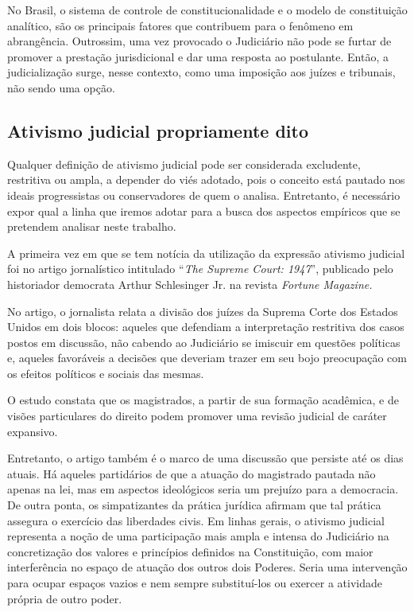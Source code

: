 {No Brasil, o sistema de controle de constitucionalidade e o modelo de
constituição analítico, são os principais fatores que contribuem para o
fenômeno em abrangência. Outrossim, uma vez provocado o Judiciário não
pode se furtar de promover a prestação jurisdicional e dar uma resposta
ao postulante. Então, a judicialização surge, nesse contexto, como uma
imposição aos juízes e tribunais, não sendo uma opção.

\subsection{Ativismo judicial propriamente dito}

Qualquer definição de ativismo judicial pode ser considerada excludente,
restritiva ou ampla, a depender do viés adotado, pois o conceito está
pautado nos ideais progressistas ou conservadores de quem o analisa.
Entretanto, é necessário expor qual a linha que iremos adotar para a
busca dos aspectos empíricos que se pretendem analisar neste trabalho.

A primeira vez em que se tem notícia da utilização da expressão ativismo
judicial foi no artigo jornalístico intitulado ``\emph{The Supreme
Court: 1947}'', publicado pelo historiador democrata Arthur Schlesinger
Jr. na revista \emph{Fortune Magazine. }

No artigo, o jornalista relata a divisão dos juízes da Suprema Corte dos
Estados Unidos em dois blocos: aqueles que defendiam a interpretação
restritiva dos casos postos em discussão, não cabendo ao Judiciário se
imiscuir em questões políticas e, aqueles favoráveis a decisões que
deveriam trazer em seu bojo preocupação com os efeitos políticos e
sociais das mesmas.

O estudo constata que os magistrados, a partir de sua formação
acadêmica, e de visões particulares do direito podem promover uma
revisão judicial de caráter expansivo.

Entretanto, o artigo também é o marco de uma discussão que persiste até
os dias atuais. Há aqueles partidários de que a atuação do magistrado
pautada não apenas na lei, mas em aspectos ideológicos seria um prejuízo
para a democracia. De outra ponta, os simpatizantes da prática jurídica
afirmam que tal prática assegura o exercício das liberdades civis. Em
linhas gerais, o ativismo judicial representa a noção de uma
participação mais ampla e intensa do Judiciário na concretização dos
valores e princípios definidos na Constituição, com maior interferência
no espaço de atuação dos outros dois Poderes. Seria uma intervenção para
ocupar espaços vazios e nem sempre substituí-los ou exercer a atividade
própria de outro poder.

}
